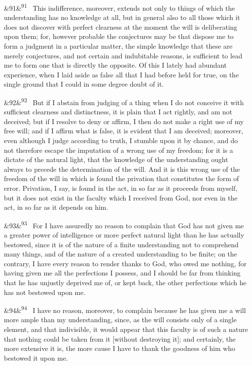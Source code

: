 \documentclass[12pt]{article}
\newcommand{\para}[1][]{\par\noindent\ifx&#1&\else\textsuperscript{\footnotesize #1}~\fi}
\begin{document}
\para[91] This indifference, moreover, extends not only to things of which the understanding has no knowledge at all, but in general also to all those which it does not discover with perfect clearness at the moment the will is deliberating upon them; for, however probable the conjectures may be that dispose me to form a judgment in a particular matter, the simple knowledge that these are merely conjectures, and not certain and indubitable reasons, is sufficient to lead me to form one that is directly the opposite. Of this I lately had abundant experience, when I laid aside as false all that I had before held for true, on the single ground that I could in some degree doubt of it.

\para[92] But if I abstain from judging of a thing when I do not conceive it with sufficient clearness and distinctness, it is plain that I act rightly, and am not deceived; but if I resolve to deny or affirm, I then do not make a right use of my free will; and if I affirm what is false, it is evident that I am deceived; moreover, even although I judge according to truth, I stumble upon it by chance, and do not therefore escape the imputation of a wrong use of my freedom; for it is a dictate of the natural light, that the knowledge of the understanding ought always to precede the determination of the will. And it is this wrong use of the freedom of the will in which is found the privation that constitutes the form of error. Privation, I say, is found in the act, in so far as it proceeds from myself, but it does not exist in the faculty which I received from God, nor even in the act, in so far as it depends on him.

\para[93] For I have assuredly no reason to complain that God has not given me a greater power of intelligence or more perfect natural light than he has actually bestowed, since it is of the nature of a finite understanding not to comprehend many things, and of the nature of a created understanding to be finite; on the contrary, I have every reason to render thanks to God, who owed me nothing, for having given me all the perfections I possess, and I should be far from thinking that he has unjustly deprived me of, or kept back, the other perfections which he has not bestowed upon me.

\para[94] I have no reason, moreover, to complain because he has given me a will more ample than my understanding, since, as the will consists only of a single element, and that indivisible, it would appear that this faculty is of such a nature that nothing could be taken from it [without destroying it]; and certainly, the more extensive it is, the more cause I have to thank the goodness of him who bestowed it upon me.
\end{document}
